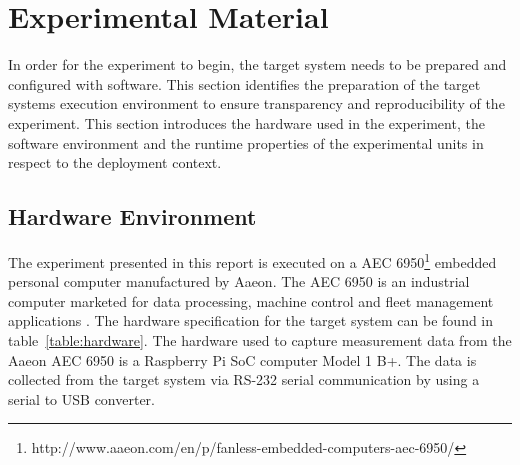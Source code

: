 


\section{Experimental Material}
\label{section:exp-material}
In order for the experiment to begin, the target system needs to be prepared and configured with software. This section identifies the preparation of the target systems execution environment to ensure transparency and reproducibility of the experiment. This section introduces the hardware used in the experiment, the software environment and the runtime properties of the experimental units in respect to the deployment context. 

\subsection{Hardware Environment}
The experiment presented in this report is executed on a AEC 6950\footnote{http://www.aaeon.com/en/p/fanless-embedded-computers-aec-6950/} embedded personal computer manufactured by Aaeon. The AEC 6950 is an industrial computer marketed for data processing, machine control and fleet management applications \cite{aaeon}. The hardware specification for the target system can be found in table~\ref{table:hardware}. The hardware used to capture measurement data from the Aaeon AEC 6950 is a Raspberry Pi SoC \cite{raspberry} computer Model 1 B+. The data is collected from the target system via RS-232 serial communication by using a serial to USB converter.  

